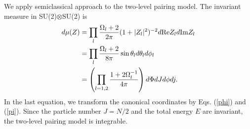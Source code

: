 \documentclass[%
superscriptaddress,
preprint,
showpacs,
nofootinbib,
amsmath,amssymb,
aps,
prc,
floatfix ]%
{revtex4-1}
\begin{document}
We apply semiclassical approach to the two-level pairing model.
The invariant measure in SU(2)$\otimes$SU(2) is 
\begin{align}
d\mu(Z) &= \prod_l \frac{\Omega_l+2}{2\pi}(1+|Z_l|^2)^{-2}d{\rm Re}Z_ld{\rm Im}Z_l \\
  &= \prod_l \frac{\Omega_l+2}{8\pi}\sin{\theta_l}d\theta_ld\phi_l \\
	&= \left(\prod_{l=1,2} \frac{1+2\Omega_l^{-1}}{4\pi}\right)
             d\Phi dJ d\phi dj .
\end{align}
In the last equation, we transform the canonical coordinates
by Eqs. (\ref{phi}) and (\ref{pi}).
Since the particle number $J=N/2$ and the total energy $E$ are invariant,
the two-level pairing model is integrable.
\end{document}

